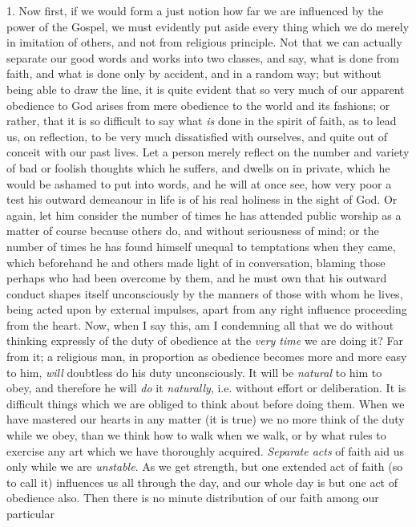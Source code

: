 1. Now first, if we would form a just notion how far
we are influenced by the power of the Gospel, we must
evidently put aside every thing which we do merely in
imitation of others, and not from religious principle. Not that we can actually separate our good words and
works into two classes, and say, what is done from faith,
and what is done only by accident, and in a random way;
but without being able to draw the line, it is quite
evident that so very much of our apparent obedience to
God arises from mere obedience to the world and its
fashions; or rather, that it is so difficult to say what \emph{is} done in the spirit of faith, as to lead us, on
reflection, to be very much dissatisfied with ourselves,
and quite out of conceit with our past lives. Let a
person merely reflect on the number and variety of bad or
foolish thoughts which he suffers, and dwells on in
private, which he would be ashamed to put into words, and
he will at once see, how very poor a test his outward
demeanour in life is of his real holiness in the sight of
God. Or again, let him consider the number of times he
has attended public worship as a matter of course because
others do, and without seriousness of mind; or the number
of times he has found himself unequal to temptations when
they came, which beforehand he and others made light of
in conversation, blaming those perhaps who had been
overcome by them, and he must own that his outward
conduct shapes itself unconsciously by the manners of
those with whom he lives, being acted upon by external
impulses, apart from any right influence proceeding from
the heart. Now, when I say this, am I condemning all that
we do without thinking expressly of the duty of obedience
at the \emph{very time} we are doing it? Far from it; a
religious man, in proportion as obedience becomes more
and more easy to him, \emph{will} doubtless do his duty
unconsciously. It will be \emph{natural} to him to
obey, and therefore he will \emph{do} it \emph{naturally},
i.e. without effort or deliberation. It is difficult
things which we are obliged to think about before doing
them. When we have mastered our hearts in any matter (it
is true) we no more think of the duty while we obey, than
we think how to walk when we walk, or by what rules to
exercise any art which we have thoroughly acquired. \emph{Separate
acts} of faith aid us only while we are \emph{unstable}.
As we get strength, but one extended act of faith (so to
call it) influences us all through the day, and our whole
day is but one act of obedience also. Then there is no
minute distribution of our faith among our particular
